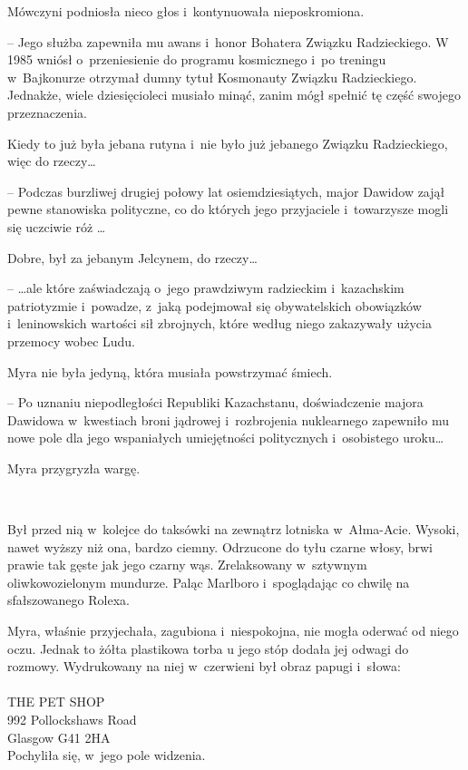 \documentclass[oneside,polish,11pt,sfheadings]{mwbk}
\begin{document}
Mówczyni podniosła nieco głos i~kontynuowała nieposkromiona.

-- Jego służba zapewniła mu awans i~honor Bohatera Związku Radzieckiego.
W 1985 wniósł o~przeniesienie do programu kosmicznego i~po treningu w~Bajkonurze otrzymał dumny tytuł Kosmonauty Związku Radzieckiego.
Jednakże, wiele dziesięcioleci musiało minąć, zanim mógł spełnić tę
część swojego przeznaczenia.

Kiedy to już była jebana rutyna i~nie było już jebanego Związku
Radzieckiego, więc do rzeczy\ldots

-- Podczas burzliwej drugiej połowy lat osiemdziesiątych, major Dawidow
zajął pewne stanowiska polityczne, co do których jego przyjaciele i~towarzysze mogli się uczciwie róż \ldots

Dobre, był za jebanym Jelcynem, do rzeczy\ldots

-- \ldots ale które zaświadczają o~jego prawdziwym radzieckim i~kazachskim
patriotyzmie i~powadze, z~jaką podejmował się obywatelskich obowiązków i~leninowskich wartości sił zbrojnych, które według niego zakazywały
użycia przemocy wobec Ludu.

Myra nie była jedyną, która musiała powstrzymać śmiech.

-- Po uznaniu niepodległości Republiki Kazachstanu, doświadczenie majora
Dawidowa w~kwestiach broni jądrowej i~rozbrojenia nuklearnego zapewniło
mu nowe pole dla jego wspaniałych umiejętności politycznych i~osobistego
uroku\ldots

Myra przygryzła wargę.

~

Był przed nią w~kolejce do taksówki na zewnątrz lotniska w~Ałma-Acie.
Wysoki, nawet wyższy niż ona, bardzo ciemny. Odrzucone do tyłu czarne
włosy, brwi prawie tak gęste jak jego czarny wąs. Zrelaksowany w~sztywnym oliwkowozielonym mundurze. Paląc Marlboro i~spoglądając co
chwilę na sfałszowanego Rolexa.

Myra, właśnie przyjechała, zagubiona i~niespokojna, nie mogła oderwać od
niego oczu. Jednak to żółta plastikowa torba u jego stóp dodała jej
odwagi do rozmowy. Wydrukowany na niej w~czerwieni był obraz papugi i~słowa:\\
\\ THE PET SHOP\\
992 Pollockshaws Road\\
Glasgow G41 2HA\\

Pochyliła się, w~jego pole widzenia.
\end{document}
